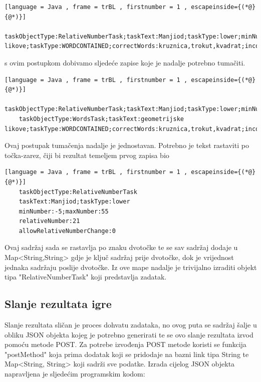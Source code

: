 \documentclass[times, utf8, zavrsni, numeric]{fer}
\begin{document}
	
	\begin{lstlisting}[language = Java , frame = trBL , firstnumber = 1 , escapeinside={(*@}{@*)}]
	taskObjectType:RelativeNumberTask;taskText:Manjiod;taskType:lower;minNumber:-5;maxNumber:55;relativeNumber:21;allowRelativeNumberChange:0#DELIMITER#taskObjectType:WordsTask;taskText:geometrijske likove;taskType:WORDCONTAINED;correctWords:kruznica,trokut,kvadrat;incorrectWords:piramida,valjak,sfera
	\end{lstlisting}
	s ovim postupkom dobivamo sljedeće zapise koje je nadalje potrebno tumačiti.
	\begin{lstlisting}[language = Java , frame = trBL , firstnumber = 1 , escapeinside={(*@}{@*)}]
	taskObjectType:RelativeNumberTask;taskText:Manjiod;taskType:lower;minNumber:-5;maxNumber:55;relativeNumber:21;allowRelativeNumberChange:0
	taskObjectType:WordsTask;taskText:geometrijske likove;taskType:WORDCONTAINED;correctWords:kruznica,trokut,kvadrat;incorrectWords:piramida,valjak,sfera
	\end{lstlisting}
	Ovaj postupak tumačenja nadalje je jednostavan. Potrebno je tekst rastaviti po točka-zarez, čiji bi rezultat temeljem prvog zapisa bio
	\begin{lstlisting}[language = Java , frame = trBL , firstnumber = 1 , escapeinside={(*@}{@*)}]
	taskObjectType:RelativeNumberTask
	taskText:Manjiod;taskType:lower
	minNumber:-5;maxNumber:55
	relativeNumber:21
	allowRelativeNumberChange:0
	\end{lstlisting}
	Ovaj sadržaj sada se rastavlja po znaku dvotočke te se sav sadržaj dodaje u Map<String,String> gdje je ključ sadržaj prije dvotočke, dok je vrijednost jednaka sadržaju poslije dvotočke.
	Iz ove mape nadalje je trivijalno izraditi objekt tipa "RelativeNumberTask" koji predstavlja zadatak. 


	\subsection{Slanje rezultata igre}
	Slanje rezultata sličan je proces dohvatu zadataka, no ovog puta se sadržaj šalje u obliku JSON objekta kojeg je potrebno generirati te se ovo slanje rezultata izvod pomoću metode POST. 
	Za potrebe izvođenja POST metode koristi se funkcija "postMethod" koja prima dodatak koji se pridodaje na bazni link tipa String te Map<String, String> koji sadrži sve podatke. 
	Izrada cijelog JSON objekta napravljena je sljedećim programskim kodom:
	
\end{document}
